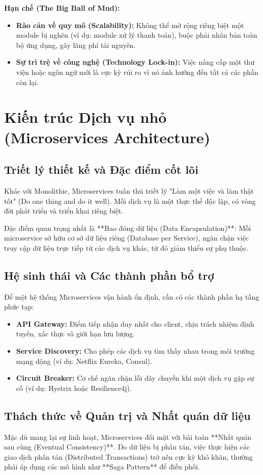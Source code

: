 \documentclass[12pt,a4paper]{report}
\begin{document}
\textbf{Hạn chế (The Big Ball of Mud):}
\begin{itemize}
    \item \textbf{Rào cản về quy mô (Scalability):} Không thể mở rộng riêng biệt một module bị nghẽn (ví dụ: module xử lý thanh toán), buộc phải nhân bản toàn bộ ứng dụng, gây lãng phí tài nguyên.
    \item \textbf{Sự trì trệ về công nghệ (Technology Lock-in):} Việc nâng cấp một thư viện hoặc ngôn ngữ mới là cực kỳ rủi ro vì nó ảnh hưởng đến tất cả các phần còn lại.
\end{itemize}

\section{Kiến trúc Dịch vụ nhỏ (Microservices Architecture)}
\subsection{Triết lý thiết kế và Đặc điểm cốt lõi}
Khác với Monolithic, Microservices tuân thủ triết lý "Làm một việc và làm thật tốt" (Do one thing and do it well). Mỗi dịch vụ là một thực thể độc lập, có vòng đời phát triển và triển khai riêng biệt. 

Đặc điểm quan trọng nhất là **Bao đóng dữ liệu (Data Encapsulation)**: Mỗi microservice sở hữu cơ sở dữ liệu riêng (Database per Service), ngăn chặn việc truy cập dữ liệu trực tiếp từ các dịch vụ khác, từ đó giảm thiểu sự phụ thuộc.

\subsection{Hệ sinh thái và Các thành phần bổ trợ}
Để một hệ thống Microservices vận hành ổn định, cần có các thành phần hạ tầng phức tạp:
\begin{itemize}
    \item \textbf{API Gateway:} Điểm tiếp nhận duy nhất cho client, chịu trách nhiệm định tuyến, xác thực và giới hạn lưu lượng.
    \item \textbf{Service Discovery:} Cho phép các dịch vụ tìm thấy nhau trong môi trường mạng động (ví dụ: Netflix Eureka, Consul).
    \item \textbf{Circuit Breaker:} Cơ chế ngăn chặn lỗi dây chuyền khi một dịch vụ gặp sự cố (ví dụ: Hystrix hoặc Resilience4j).
\end{itemize}


\subsection{Thách thức về Quản trị và Nhất quán dữ liệu}
Mặc dù mang lại sự linh hoạt, Microservices đối mặt với bài toán **Nhất quán sau cùng (Eventual Consistency)**. Do dữ liệu bị phân tán, việc thực hiện các giao dịch phân tán (Distributed Transactions) trở nên cực kỳ khó khăn, thường phải áp dụng các mô hình như **Saga Pattern** để điều phối.
\end{document}
